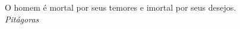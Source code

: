 \pretextualchapter{}
\vfill
\begin{flushright}
	O homem é mortal por seus temores e imortal por seus desejos.\\
	\textit{Pitágoras}
\end{flushright}
